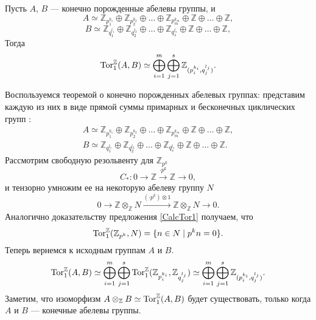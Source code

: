     \begin{Proposal}
        Пусть $A$, $B$ --- конечно порожденные абелевы группы, и
        $$
            A \simeq \mathbb{Z}_{p_1^{k_1}} \oplus \mathbb{Z}_{p_2^{k_2}} \oplus \dots \oplus \mathbb{Z}_{p_m^{k_m}} \oplus \mathbb{Z} \oplus \dots \oplus \mathbb{Z},
        $$
        $$
            B \simeq \mathbb{Z}_{q_1^{l_1}} \oplus \mathbb{Z}_{q_2^{l_2}} \oplus \dots \oplus \mathbb{Z}_{q_s^{l_s}} \oplus \mathbb{Z} \oplus \dots \oplus \mathbb{Z},
        $$
        Тогда 
        $$\textup{Tor}_1^{\mathbb{Z}}(A, B) \simeq \bigoplus_{i=1}^{m} \bigoplus_{j=1}^{s} \mathbb{Z}_{(p_i^{k_i}, q_j^{l_j})}.$$
    \end{Proposal}
    \begin{Proof}
        Воспользуемся теоремой о конечно порожденных абелевых группах: представим каждую из них в виде прямой суммы примарных и бесконечных циклических групп \cite{Vinberg}:
        \begin{gather*}
            A \simeq \mathbb{Z}_{p_1^{k_1}} \oplus \mathbb{Z}_{p_2^{k_2}} \oplus \dots \oplus \mathbb{Z}_{p_m^{k_m}} \oplus \mathbb{Z} \oplus \dots \oplus \mathbb{Z},\\
            B \simeq \mathbb{Z}_{q_1^{l_1}} \oplus \mathbb{Z}_{q_2^{l_2}} \oplus \dots \oplus \mathbb{Z}_{q_s^{l_s}} \oplus \mathbb{Z} \oplus \dots \oplus \mathbb{Z}.
        \end{gather*}
        Рассмотрим свободную резольвенту для $\mathbb{Z}_{p^k}$ 
        \begin{equation*}
            C_* : 0 \rightarrow \mathbb{Z} \xrightarrow{\cdot p^k} \mathbb{Z} \rightarrow 0,
        \end{equation*}
        и тензорно умножим ее на некоторую абелеву группу $N$
        \begin{equation*}
             0 \rightarrow \mathbb{Z} \otimes_\mathbb{Z} N \xrightarrow{(\cdot p^k) \otimes 1} \mathbb{Z} \otimes_\mathbb{Z} N \rightarrow 0.
        \end{equation*}
        Аналогично доказательству предложения \ref{CalcTor1} получаем, что 
        \begin{equation*}
            \textup{Tor}_1^\mathbb{Z}(\mathbb{Z}_{p^k}, N) = \{n \in N \mid p^kn = 0\}.
        \end{equation*}
        Теперь вернемся к исходным группам $A$ и $B$.
        \begin{equation*}
            \textup{Tor}_1^\mathbb{Z}(A, B) \simeq \bigoplus_{i=1}^{m} \bigoplus_{j=1}^{s} \textup{Tor}_1^\mathbb{Z}(\mathbb{Z}_{p_i^{k_i}}, \mathbb{Z}_{q_j^{l_j}}) \simeq 
            \bigoplus_{i=1}^{m} \bigoplus_{j=1}^{s} \mathbb{Z}_{(p_i^{k_i}, q_j^{l_j})}.
        \end{equation*}
        Заметим, что изоморфизм $A \otimes_{\mathbb{Z}} B \simeq \textup{Tor}_1^{\mathbb{Z}}(A, B)$ будет существовать, только когда $A$ и $B$ --- конечные абелевы группы. 
    \end{Proof}
    
